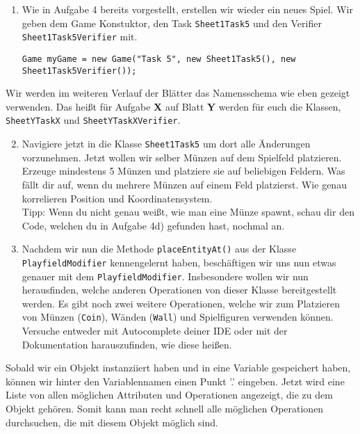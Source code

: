 

\begin{enumerate}
    \item Wie in Aufgabe 4 bereits vorgestellt, erstellen wir wieder ein neues Spiel. Wir geben dem Game Konstuktor, den Task \texttt{Sheet1Task5} und den Verifier \texttt{Sheet1Task5Verifier} mit.

    \begin{lstlisting}
Game myGame = new Game("Task 5", new Sheet1Task5(), new Sheet1Task5Verifier());
    \end{lstlisting}
\end{enumerate}

\begin{Infobox}[Aufgabenbenennung]
    Wir werden im weiteren Verlauf der Blätter das Namensschema wie eben gezeigt verwenden. Das heißt für Aufgabe \textbf{X} auf Blatt \textbf{Y} werden für euch die Klassen, \texttt{SheetYTaskX} und \texttt{SheetYTaskXVerifier}.
\end{Infobox}

\begin{enumerate} \setcounter{enumi}{1}
    \item Navigiere jetzt in die Klasse \texttt{Sheet1Task5} um dort alle Änderungen vorzunehmen. Jetzt wollen wir selber Münzen auf dem Spielfeld platzieren. Erzeuge mindestens 5 Münzen und platziere sie auf beliebigen Feldern. Was fällt dir auf, wenn du mehrere Münzen auf einem Feld platzierst. Wie genau korrelieren Position und Koordinatensystem.\\
        Tipp: Wenn du nicht genau weißt, wie man eine Münze spawnt, schau dir den Code, welchen du in Aufgabe 4d) gefunden hast, nochmal an.

    \item Nachdem wir nun die Methode \texttt{placeEntityAt()} aus der Klasse \texttt{PlayfieldModifier} kennengelernt haben, beschäftigen wir uns nun etwas genauer mit dem \texttt{PlayfieldModifier}. Insbesondere wollen wir nun herausfinden, welche anderen Operationen von dieser Klasse bereitgestellt werden. Es gibt noch zwei weitere Operationen, welche wir zum Platzieren von Münzen (\texttt{Coin}), Wänden (\texttt{Wall}) und Spielfiguren verwenden können. Versuche entweder mit Autocomplete deiner IDE oder mit der Dokumentation harauszufinden, wie diese heißen.
\end{enumerate}

\begin{Infobox}[Autocompletion]
    Sobald wir ein Objekt instanziiert haben und in eine Variable gespeichert haben, können wir hinter den Variablennamen einen Punkt '.' eingeben. Jetzt wird eine Liste von allen möglichen Attributen und Operationen angezeigt, die zu dem Objekt gehören. Somit kann man recht schnell alle möglichen Operationen durchsuchen, die mit diesem Objekt möglich sind.
\end{Infobox}

